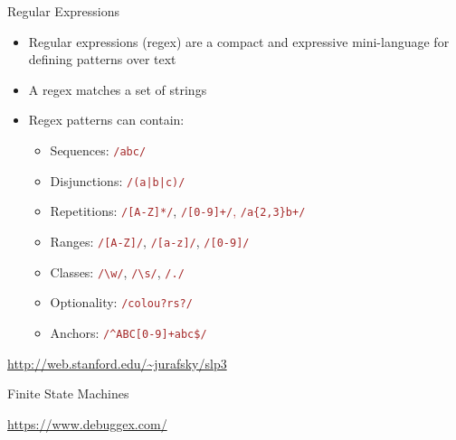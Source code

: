 \documentclass[10pt]{beamer}
\begin{document}
\begin{frame}{Regular Expressions}
\begin{itemize}
  \item \alert{Regular expressions} (regex) are a compact and expressive mini-language for defining \alert{patterns} over text
  \item A regex \alert{matches} a set of strings
  \item Regex patterns can contain:
  \begin{itemize}
    \item Sequences: \textcolor{brown}{\texttt{/abc/}}
    \item Disjunctions: \textcolor{brown}{\texttt{/(a|b|c)/}}
    \item Repetitions: \textcolor{brown}{\texttt{/[A-Z]*/}}, \textcolor{brown}{\texttt{/[0-9]+/}, \textcolor{brown}{\texttt{/a\{2,3\}b+/}}}
    \item Ranges: \textcolor{brown}{\texttt{/[A-Z]/}}, \textcolor{brown}{\texttt{/[a-z]/}}, \textcolor{brown}{\texttt{/[0-9]/}}
    \item Classes: \textcolor{brown}{\texttt{/\textbackslash w/}}, \textcolor{brown}{\texttt{/\textbackslash s/}}, \textcolor{brown}{\texttt{/./}}
    \item Optionality: \textcolor{brown}{\texttt{/colou?rs?/}}
    \item Anchors: \textcolor{brown}{\texttt{/\textasciicircum ABC[0-9]+abc\$/}}
  \end{itemize}
\end{itemize}
\begin{center}
  \textcolor{blue}{\url{http://web.stanford.edu/~jurafsky/slp3}}
\end{center}
\end{frame}

\begin{frame}{Finite State Machines}
  \begin{center}
  \end{center}
  \begin{center}
    \textcolor{blue}{\url{https://www.debuggex.com/}}
  \end{center}
\end{frame}
\end{document}

